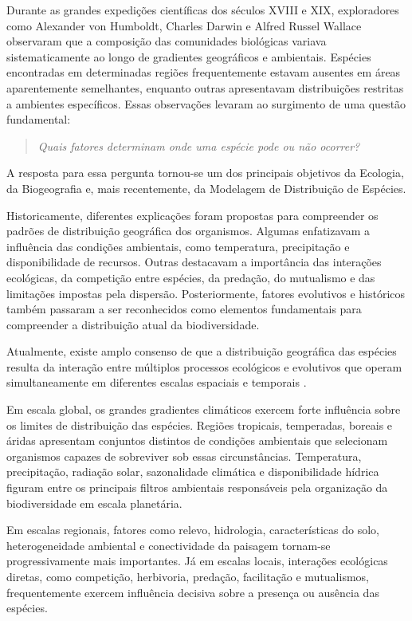 Durante as grandes expedições científicas dos séculos XVIII e XIX, exploradores como Alexander von Humboldt, Charles Darwin e Alfred Russel Wallace observaram que a composição das comunidades biológicas variava sistematicamente ao longo de gradientes geográficos e ambientais. Espécies encontradas em determinadas regiões frequentemente estavam ausentes em áreas aparentemente semelhantes, enquanto outras apresentavam distribuições restritas a ambientes específicos. Essas observações levaram ao surgimento de uma questão fundamental:

\begin{quote}
	\textit{Quais fatores determinam onde uma espécie pode ou não ocorrer?}
\end{quote}

A resposta para essa pergunta tornou-se um dos principais objetivos da Ecologia, da Biogeografia e, mais recentemente, da Modelagem de Distribuição de Espécies.

Historicamente, diferentes explicações foram propostas para compreender os padrões de distribuição geográfica dos organismos. Algumas enfatizavam a influência das condições ambientais, como temperatura, precipitação e disponibilidade de recursos. Outras destacavam a importância das interações ecológicas, da competição entre espécies, da predação, do mutualismo e das limitações impostas pela dispersão. Posteriormente, fatores evolutivos e históricos também passaram a ser reconhecidos como elementos fundamentais para compreender a distribuição atual da biodiversidade.

Atualmente, existe amplo consenso de que a distribuição geográfica das espécies resulta da interação entre múltiplos processos ecológicos e evolutivos que operam simultaneamente em diferentes escalas espaciais e temporais \parencite{brown1995,wiens2011,franklin2010,guisan2017habitat}.

Em escala global, os grandes gradientes climáticos exercem forte influência sobre os limites de distribuição das espécies. Regiões tropicais, temperadas, boreais e áridas apresentam conjuntos distintos de condições ambientais que selecionam organismos capazes de sobreviver sob essas circunstâncias. Temperatura, precipitação, radiação solar, sazonalidade climática e disponibilidade hídrica figuram entre os principais filtros ambientais responsáveis pela organização da biodiversidade em escala planetária.

Em escalas regionais, fatores como relevo, hidrologia, características do solo, heterogeneidade ambiental e conectividade da paisagem tornam-se progressivamente mais importantes. Já em escalas locais, interações ecológicas diretas, como competição, herbivoria, predação, facilitação e mutualismos, frequentemente exercem influência decisiva sobre a presença ou ausência das espécies.

